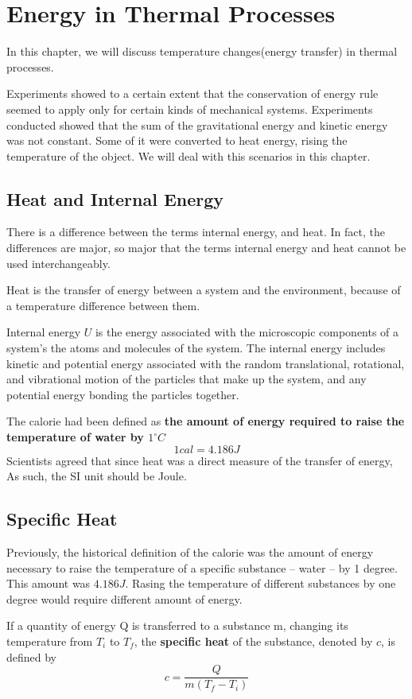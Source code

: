 \section{Energy in Thermal Processes}
In this chapter, we will discuss temperature changes(energy transfer) in thermal processes.

Experiments showed to a certain extent that the conservation of energy rule seemed to apply only for certain kinds of mechanical systems. Experiments conducted showed that the sum of the gravitational energy and kinetic energy was not constant. Some of it were converted to heat energy, rising the temperature of the object. We will deal with this scenarios in this chapter.

\subsection{Heat and Internal Energy}
There is a difference between the terms internal energy, and heat. In fact, the differences are major, so major that the terms internal energy and heat cannot be used interchangeably.

Heat is the transfer of energy between a system and the environment, because of a temperature difference between them.

Internal energy $U$ is the energy associated with the microscopic components of a system's the atoms and molecules of the system. The internal energy includes kinetic and potential energy associated with the random translational, rotational, and vibrational motion of the particles that make up the system, and any potential energy bonding the particles together.

The calorie had been defined as \textbf{the amount of energy required to raise the temperature of water by $1^\circ C$}
$$1 cal = 4.186J$$
Scientists agreed that since heat was a direct measure of the transfer of energy, As such, the SI unit should be Joule.

\subsection{Specific Heat}
Previously, the historical definition of the calorie was the amount of energy necessary to raise the temperature of a specific substance -- water -- by 1 degree. This amount was $4.186J$. Rasing the temperature of different substances by one degree would require different amount of energy.

\begin{defi}
If a quantity of energy Q is transferred to a substance m, changing its temperature from $T_i$ to $T_f$, the \textbf{specific heat} of the substance, denoted by $c$, is defined by
$$c=\frac{Q}{m\left(T_f-T_i\right)}$$
\end{defi}

